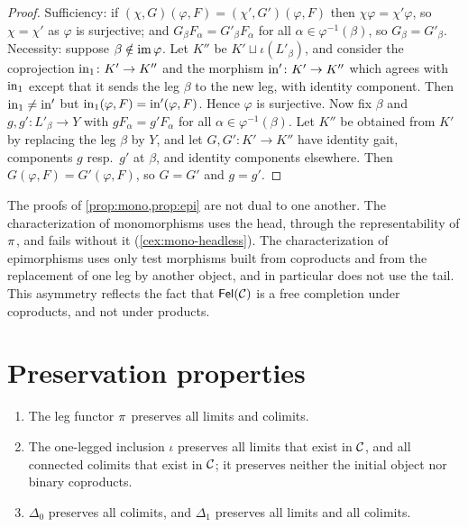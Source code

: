\begin{proof}
Sufficiency: if $(\chi,G)(\varphi,F)=(\chi',G')(\varphi,F)$ then
$\chi\varphi=\chi'\varphi$, so $\chi=\chi'$ as $\varphi$ is surjective; and
$G_\beta F_\alpha=G'_\beta F_\alpha$ for all $\alpha\in\varphi^{-1}(\beta)$, so
$G_\beta=G'_\beta$. Necessity: suppose $\beta\notin\operatorname{im}\varphi$. Let $K''$ be
$K'\sqcup\iota(L'_\beta)$, and consider the coprojection
$\mathrm{in}_1\colon K'\to K''$ and the morphism $\mathrm{in}'\colon K'\to K''$ which agrees
with $\mathrm{in}_1$ except that it sends the leg $\beta$ to the new leg, with
identity component. Then $\mathrm{in}_1\neq\mathrm{in}'$ but
$\mathrm{in}_1(\varphi,F)=\mathrm{in}'(\varphi,F)$. Hence $\varphi$ is surjective. Now fix
$\beta$ and $g,g'\colon L'_\beta\to Y$ with $gF_\alpha=g'F_\alpha$ for all
$\alpha\in\varphi^{-1}(\beta)$. Let $K''$ be obtained from $K'$ by replacing the
leg $\beta$ by $Y$, and let $G,G'\colon K'\to K''$ have identity gait, components
$g$ resp.\ $g'$ at $\beta$, and identity components elsewhere. Then
$G(\varphi,F)=G'(\varphi,F)$, so $G=G'$ and $g=g'$.
\end{proof}

\begin{remark}\label{rem:mono-epi-asymmetry}
The proofs of \cref{prop:mono,prop:epi} are not dual to one another. The
characterization of monomorphisms uses the head, through the
representability of $\pi$, and fails without it
(\cref{cex:mono-headless}). The characterization of epimorphisms uses only
test morphisms built from coproducts and from the replacement of one leg by
another object, and in particular does not use the tail. This
asymmetry reflects the fact that $\mathsf{Fel}(\mathcal{C})$ is a free completion under
coproducts, and not under products.
\end{remark}

\section{Preservation properties}\label{sec:preservation}

\begin{proposition}\label{prop:preservation}
\begin{enumerate}
\item The leg functor $\pi$ preserves all limits and colimits.
\item The one-legged inclusion $\iota$ preserves all limits that exist in $\mathcal{C}$,
  and all connected colimits that exist in $\mathcal{C}$; it preserves neither the
  initial object nor binary coproducts.
\item $\Delta_0$ preserves all colimits, and $\Delta_1$ preserves all limits and
  all colimits.
\end{enumerate}
\end{proposition}

